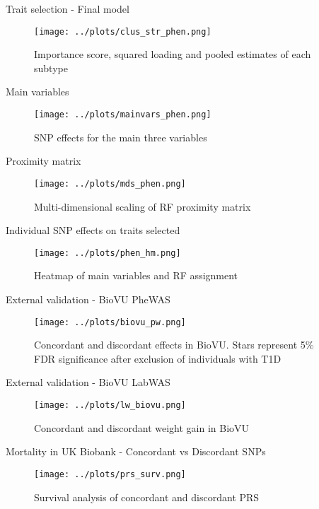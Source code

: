 \documentclass[presentation]{beamer}
\begin{document}
\begin{frame}[label={sec:org5785116}]{Trait selection - Final model}
\begin{figure}[htbp]
\centering
\texttt{[image: ../plots/clus\_str\_phen.png]}
\caption{Importance score, squared loading and pooled estimates of each subtype}
\end{figure}
\end{frame}
\begin{frame}[label={sec:org029965b}]{Main variables}
\begin{figure}[htbp]
\centering
\texttt{[image: ../plots/mainvars\_phen.png]}
\caption{SNP effects for the main three variables}
\end{figure}
\end{frame}
\begin{frame}[label={sec:orgc219542}]{Proximity matrix}
\begin{figure}[htbp]
\centering
\texttt{[image: ../plots/mds\_phen.png]}
\caption{Multi-dimensional scaling of RF proximity matrix}
\end{figure}
\end{frame}
\begin{frame}[label={sec:org9905635}]{Individual SNP effects on traits selected}
\begin{figure}[htbp]
\centering
\texttt{[image: ../plots/phen\_hm.png]}
\caption{Heatmap of main variables and RF assignment}
\end{figure}
\end{frame}
\begin{frame}[label={sec:orgb4ef333}]{External validation - BioVU PheWAS}
\begin{figure}[htbp]
\centering
\texttt{[image: ../plots/biovu\_pw.png]}
\caption{Concordant and discordant effects in BioVU. Stars represent 5\% FDR significance after exclusion of individuals with T1D}
\end{figure}
\end{frame}
\begin{frame}[label={sec:orgeb8778b}]{External validation - BioVU LabWAS}
\begin{figure}[htbp]
\centering
\texttt{[image: ../plots/lw\_biovu.png]}
\caption{Concordant and discordant weight gain in BioVU}
\end{figure}
\end{frame}
\begin{frame}[label={sec:org15ef6fd}]{Mortality in UK Biobank - Concordant vs Discordant SNPs}
\begin{figure}[htbp]
\centering
\texttt{[image: ../plots/prs\_surv.png]}
\caption{Survival analysis of concordant and discordant PRS}
\end{figure}
\end{frame}
\end{document}
